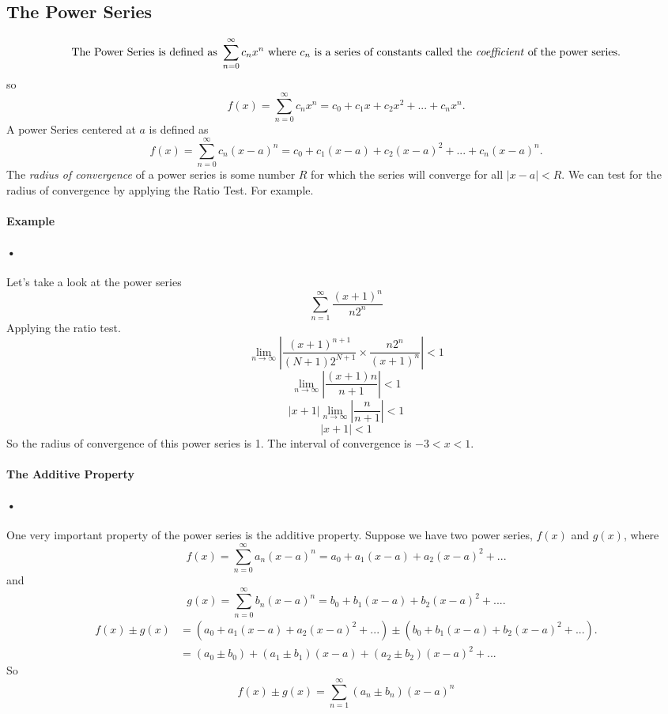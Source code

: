 \documentclass[font =22]{report}
\begin{document}
\subsection*{The Power Series}
\[
\text{The Power Series is defined as } \sum_{n=0}^\infty c_nx^n \text{ where } c_n \text{ is a series of constants called the \textit{coefficient} of the power series.}
\]
so
\[
f(x) = \sum_{n=0}^\infty c_nx^n= c_0+c_1x+c_2x^2+...+c_nx^n.
\]
A power Series centered at $a$ is defined as 
\[
f(x)=\sum_{n=0}^\infty c_n(x-a)^n= c_0+c_1(x-a)+c_2(x-a)^2+...+c_n(x-a)^n.
\]
The \textit{radius of convergence} of a power series is some number $R$ for which the series will converge for all $|x-a|<R$. We can test for the radius of convergence by applying the Ratio Test. For example. 
\paragraph{Example}
\paragraph{•}
Let's take a look at the power series
\[
\sum_{n=1}^\infty \frac{(x+1)^n}{n2^n}
\]
Applying the ratio test.
\[
\lim_{n\to\infty}\left\lvert\frac{(x+1)^{n+1}}{(N+1)2^{N+1}}\times \frac{n2^n}{(x+1)^n}\right\rvert <1
\]
\[
\lim_{n\to\infty}\left\lvert \frac{(x+1)n}{{n+1}}\right\rvert <1
\]
\[
|x+1|\lim_{n\to\infty}\left\lvert \frac{n}{n+1} \right\lvert <1
\]
\[
|x+1|<1
\]
So the radius of convergence of this power series is 1. The interval of convergence is $-3<x<1$.
\paragraph{The Additive Property}
\paragraph{•}
One very important property of the power series is the additive property. Suppose we have two power series, $f(x)$ and $g(x)$, where 
\[
f(x)=\sum_{n=0}^\infty a_n(x-a)^n= a_0+a_1(x-a)+a_2(x-a)^2+...
\]
and
\[
g(x) = \sum_{n=0}^\infty b_n(x-a)^n= b_0+b_1(x-a)+b_2(x-a)^2+....
\]
\begin{align*}
f(x)\pm g(x) &= (a_0+a_1(x-a)+a_2(x-a)^2+...) \pm (b_0+b_1(x-a)+b_2(x-a)^2+...).\\
&= (a_0 \pm b_0)+(a_1 \pm b_1)(x-a)+(a_2 \pm b_2)(x-a)^2 +...
\end{align*}
So 
\[
f(x)\pm g(x) = \sum_{n=1}^\infty (a_n \pm b_n)(x-a)^n
\]
\end{document}
